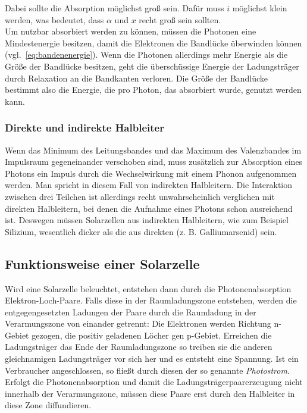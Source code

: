 \documentclass[slug=SZ, room=Hermann-Krone-Bau\,\ Labor\ 1.25,
supervisor=Martin\ Kroll, coursedate=14.\ 11.\ 2019]{../../Lab_Report_LaTeX/lab_report}
\begin{document}
Dabei sollte die Absorption möglichst groß sein. Dafür muss \(i\) möglichst klein werden, was bedeutet, dass
\(\alpha\) und \(x\) recht groß sein sollten.\\

Um nutzbar absorbiert werden zu können, müssen die Photonen eine Mindestenergie besitzen, damit die Elektronen
die Bandlücke überwinden können (vgl.~\ref{eq:bandenenergie}). Wenn die Photonen allerdings mehr Energie als
die Größe der Bandlücke besitzen, geht die überschüssige Energie der Ladungsträger durch Relaxation an die
Bandkanten verloren. Die Größe der Bandlücke bestimmt also die Energie, die pro Photon, das absorbiert wurde,
genutzt werden kann.

\subsubsection{Direkte und indirekte Halbleiter}
\label{sec:dirindhalb}

Wenn das Minimum des Leitungsbandes und das Maximum des Valenzbandes im Impulsraum gegeneinander verschoben sind,
muss zusätzlich zur Absorption eines Photons ein Impuls durch die Wechselwirkung mit einem Phonon aufgenommen
werden. Man spricht in diesem Fall von indirekten Halbleitern. Die Interaktion zwischen drei Teilchen ist
allerdings recht unwahrscheinlich verglichen mit direkten Halbleitern, bei denen die Aufnahme eines Photons schon
ausreichend ist.
Deswegen müssen Solarzellen aus indirekten Halbleitern, wie zum Beispiel Silizium, wesentlich dicker als die
aus direkten (z. B. Galliumarsenid) sein.

\subsection{Funktionsweise einer Solarzelle}
\label{sec:solar}

Wird eine Solarzelle beleuchtet, entstehen dann durch die Photonenabsorption Elektron-Loch-Paare. Falls diese in der
Raumladungszone entstehen, werden die entgegengesetzten Ladungen der Paare durch die Raumladung in der
Verarmungszone von einander getrennt:
Die Elektronen werden Richtung n-Gebiet gezogen, die positiv geladenen Löcher gen p-Gebiet.
Erreichen die Ladungsträger das Ende der Raumladungszone so treiben sie die anderen gleichnamigen Ladungsträger
vor sich her und es entsteht eine Spannung. Ist ein Verbraucher angeschlossen, so fließt durch diesen der so genannte \emph{Photostrom}.
Erfolgt die Photonenabsorption und damit die Ladungsträgerpaarerzeugung nicht innerhalb der Verarmungszone,
müssen diese Paare erst durch den Halbleiter in diese Zone diffundieren.
\end{document}
